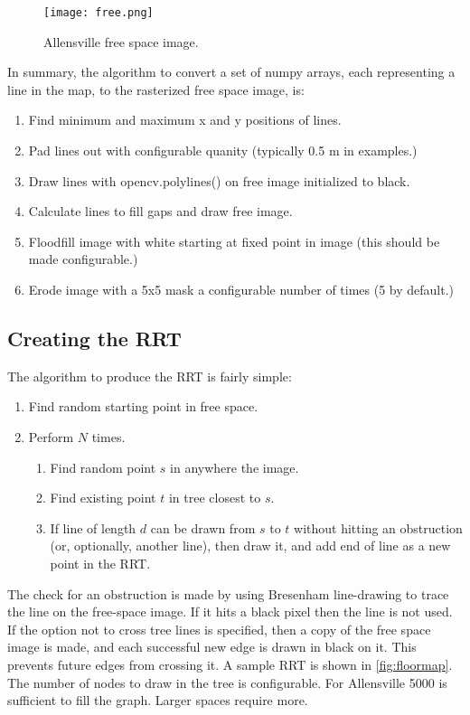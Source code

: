 \documentclass[10pt,twocolumn,letterpaper]{article}
\begin{document}
\begin{centering}
\begin{figure}[ht]
\caption{Allensville free space image.}
\centering
\texttt{[image: free.png]}
\label{fig:free}
\end{figure}
\end{centering}

In summary, the algorithm to convert a set of numpy arrays, each
representing a line in the map, to the rasterized free space image,
is:

\begin{enumerate}
\item Find minimum and maximum x and y positions of lines.
\item Pad lines out with configurable quanity (typically 0.5 m in examples.)
\item Draw lines with opencv.polylines() on free image initialized to black.
\item Calculate lines to fill gaps and draw free image.
\item Floodfill image with white starting at fixed point in image (this should be made configurable.)
\item Erode image with a 5x5 mask a configurable number of times (5 by default.)
\end{enumerate}

\subsection{Creating the RRT}

The algorithm to produce the RRT is fairly simple:

\begin{enumerate}
\item Find random starting point in free space.
\item Perform $N$ times.
\begin{enumerate}
\item Find random point $s$ in anywhere the image.
\item Find existing point $t$ in tree closest to $s$.
\item If line of length $d$ can be drawn from $s$ to $t$ without
  hitting an obstruction (or, optionally, another line), then draw it,
  and add end of line as a new point in the RRT.
\end{enumerate}
\end{enumerate}

The check for an obstruction is made by using Bresenham line-drawing
to trace the line on the free-space image. If it hits a black pixel
then the line is not used. If the option not to cross tree lines is
specified, then a copy of the free space image is made, and each
successful new edge is drawn in black on it. This prevents future
edges from crossing it.  A sample RRT is shown in
\ref{fig:floormap}. The number of nodes to draw in the tree is
configurable. For Allensville 5000 is sufficient to fill the
graph. Larger spaces require more.
\end{document}
